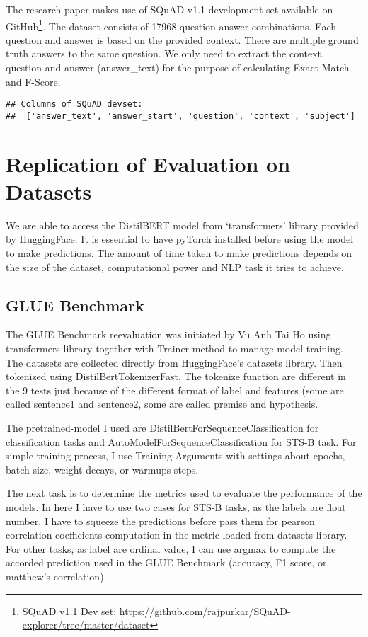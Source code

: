 \documentclass[
  11pt,
]{article}
\begin{document}
The research paper makes use of SQuAD v1.1 development set available on
GitHub\footnote{SQuAD v1.1 Dev set:
  \url{https://github.com/rajpurkar/SQuAD-explorer/tree/master/dataset}}.
The dataset consists of 17968 question-answer combinations. Each
question and answer is based on the provided context. There are multiple
ground truth answers to the same question. We only need to extract the
context, question and answer (answer\_text) for the purpose of
calculating Exact Match and F-Score.

\begin{verbatim}
## Columns of SQuAD devset:
##  ['answer_text', 'answer_start', 'question', 'context', 'subject']
\end{verbatim}

\section{Replication of Evaluation on
Datasets}\label{replication-of-evaluation-on-datasets}

We are able to access the DistilBERT model from `transformers' library
provided by HuggingFace. It is essential to have pyTorch installed
before using the model to make predictions. The amount of time taken to
make predictions depends on the size of the dataset, computational power
and NLP task it tries to achieve.

\subsection{GLUE Benchmark}\label{glue-benchmark-1}

The GLUE Benchmark reevaluation was initiated by Vu Anh Tai Ho using
transformers library together with Trainer method to manage model
training. The datasets are collected directly from HuggingFace's
datasets library. Then tokenized using DistilBertTokenizerFast. The
tokenize function are different in the 9 tests just because of the
different format of label and features (some are called sentence1 and
sentence2, some are called premise and hypothesis.

The pretrained-model I used are DistilBertForSequenceClassification for
classification tasks and AutoModelForSequenceClassification for STS-B
task. For simple training process, I use Training Arguments with
settings about epochs, batch size, weight decays, or warmups steps.

The next task is to determine the metrics used to evaluate the
performance of the models. In here I have to use two cases for STS-B
tasks, as the labels are float number, I have to squeeze the predictions
before pass them for pearson correlation coefficients computation in the
metric loaded from datasets library. For other tasks, as label are
ordinal value, I can use argmax to compute the accorded prediction used
in the GLUE Benchmark (accuracy, F1 score, or matthew's correlation)
\end{document}

